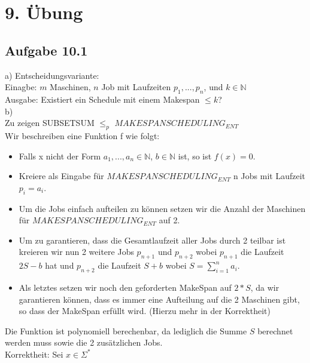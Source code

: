 \section*{9. Übung}
\subsection*{Aufgabe 10.1}
a) Entscheidungsvariante:\\
Einagbe: $m$ Maschinen, $n$ Job mit Laufzeiten $p_1,...,p_n$, und $k \in \mathbb{N}$\\
Ausgabe: Existiert ein Schedule mit einem Makespan $\le k$?\\

b)\\
Zu zeigen SUBSETSUM $\le_p$ $MAKESPANSCHEDULING_{ENT}$\\
Wir beschreiben eine Funktion f wie folgt:

\begin{itemize}
	\item Falls x nicht der Form $a_1,...,a_n \in \mathbb{N}$, $b \in \mathbb{N}$ ist, so ist $f(x) = 0$.
	\item Kreiere als Eingabe für $MAKESPANSCHEDULING_{ENT}$ n Jobs mit Laufzeit $p_i = a_i$.
	\item Um die Jobs einfach aufteilen zu können setzen wir die Anzahl der Maschinen für $MAKESPANSCHEDULING_{ENT}$ auf 2.
	\item Um zu garantieren, dass die Gesamtlaufzeit aller Jobs durch 2 teilbar ist kreieren wir nun 2 weitere Jobs $p_{n+1}$ und 
		$p_{n+2}$ wobei $p_{n+1}$ die Laufzeit $2S - b$ hat und $p_{n+2}$ die Laufzeit $S + b$ wobei $S = \sum_{i=1}^{n} a_i$.
	\item Als letztes setzen wir noch den geforderten MakeSpan auf $2*S$, da wir garantieren können, dass es immer eine Aufteilung
		auf die 2 Maschinen gibt, so dass der MakeSpan erfüllt wird. (Hierzu mehr in der Korrektheit)
\end{itemize}
Die Funktion ist polynomiell berechenbar, da lediglich die Summe $S$ berechnet werden muss sowie die 2 zusätzlichen Jobs.\\

Korrektheit: Sei $x \in \Sigma^{*}$

